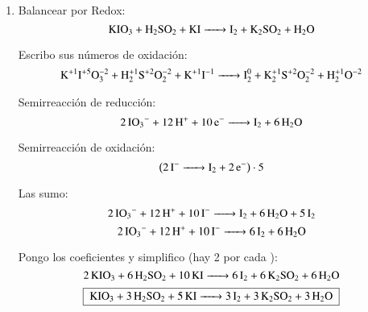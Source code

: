 \begin{enumerate}
\item Balancear por Redox:
$$\ce{KIO3 + H2SO2 + KI ->
I2 + K2SO2 + H2O}$$

Escribo sus números de oxidación:
$$\ce{K^{+1}I^{+5}O^{-2}3 + H^{+1}2S^{+2}O^{-2}2 + K^{+1}I^{-1} ->
I^{0}2 + K^{+1}2S^{+2}O^{-2}2 + H^{+1}2O^{-2}}$$


\begin{multicols}{2}
    Semirreacción de reducción:
    $$\ce{
    2IO3^- + 12H^+ + 10e^- ->
    I2 + 6H2O
    }$$
    
    Semirreacción de oxidación:
    $$\left(\ce{
    2I^- ->
    I2 + 2e^-
    }\right) \cdot 5$$
\end{multicols}

Las sumo:
$$\ce{ 2IO3^- + 12H^+ + 10I^- ->
I2 + 6H2O + 5I2 }$$
$$\ce{ 2IO3^- + 12H^+ + 10I^- ->
6I2 + 6H2O }$$

Pongo los coeficientes y simplifico (hay 2  por cada ):
$$\ce{ 2KIO3 + 6H2SO2 + 10KI ->
6I2 + 6K2SO2 + 6H2O}$$
$$\fbox{
\ce{ KIO3 + 3H2SO2 + 5KI ->
3I2 + 3K2SO2 + 3H2O}
}$$
\end{enumerate}